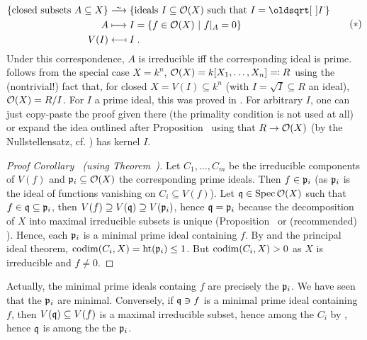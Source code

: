 \documentclass[a4paper,parskip=half,numbers=enddot, DIV=12]{scrreprt}
\begin{document}
\begin{rem}
\begin{alphanumerate}
        \begin{align}\lbl{eq:bijectiveCorrespondenceO(X)}
	        \begin{split}
		        \{\text{closed subsets }A\subseteq X\}&\isomorphism\left\{\text{ideals }I\subseteq \Oo(X)\text{ such that }I=\sqrt{I}\right\}\\
		        A&\longmapsto I=\left\{f\in \Oo(X)\st f|_A=0\right\}\\
		        V(I)&\longmapsfrom I\;.
	        \end{split}\tag{$*$}
        \end{align}
        Under this correspondence, $A$ is irreducible iff the corresponding ideal is prime.  follows from the special case $X=k^n$, $\mathcal{O}(X)=k[X_1,\ldots,X_n]\eqqcolon R$ using the (nontrivial!) fact that, for closed $X=V(I)\subseteq k^n$ (with $I=\sqrt{I}\subseteq R$ an ideal), $\mathcal{O}(X)=R/I$. For $I$ a prime ideal, this was proved in \cite[Proposition~2.2.2]{alg1}. For arbitrary $I$, one can just copy-paste the proof given there (the primality condition is not used at all) or expand the idea outlined after Proposition~ using that $R\to\mathcal{O}(X)$ (by the Nullstellensatz, cf. \cite[Proposition~1.7.1]{alg1}) has kernel $I$.
    \end{alphanumerate}
\end{rem}
\begin{proof}[Proof Corollary~ (using Theorem~)]
	Let $C_1,\ldots,C_m$ be the irreducible components of $V(f)$ and $\mathfrak{p}_i\subseteq\mathcal{O}(X)$ the corresponding prime ideals. Then $f\in\mathfrak{p}_i$ (as $\mathfrak{p}_i$ is the ideal of functions vanishing on $C_i\subseteq V(f)$). Let $\mathfrak{q}\in\operatorname{Spec}\mathcal{O}(X)$ such that $f\in\mathfrak{q}\subseteq\mathfrak{p}_i$, then $V(f)\supseteq V(\mathfrak{q})\supseteq V(\mathfrak{p}_i)$, hence $\mathfrak{q}=\mathfrak{p}_i$ because the decomposition of $X$ into maximal irreducible subsets is unique (Proposition~ or (recommended) \cite[Proposition~2.1.1]{alg1}). Hence, each $\mathfrak{p}_i$ is a minimal prime ideal containing $f$. By  and the principal ideal theorem, $\operatorname{codim}(C_i,X)=\operatorname{ht}(\mathfrak{p}_i)\leq1$. But $\operatorname{codim}(C_i,X)>0$ as $X$ is irreducible and $f\not=0$.
\end{proof}
\begin{rem*}
	Actually, the minimal prime ideals containg $f$ are precisely the $\mathfrak{p}_i$. We have seen that the $\mathfrak{p}_i$ are minimal. Conversely, if $\mathfrak{q}\ni f$ is a minimal prime ideal containing $f$, then $V(\mathfrak{q})\subseteq V(f)$ is a maximal irreducible subset, hence among the $C_i$ by \cite[Proposition~2.1.1]{alg1}, hence $\mathfrak{q}$ is among the the $\mathfrak{p}_i$.
\end{rem*}
\end{document}
